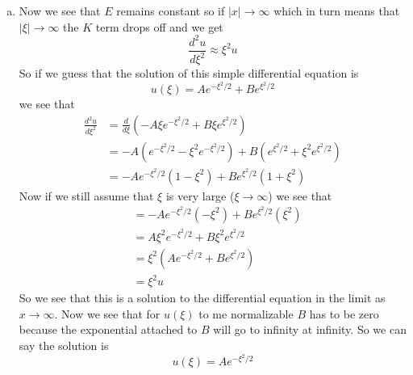 \documentclass[11pt]{article}
\numberwithin{equation}{section}
\begin{document}
\begin{enumerate}[(a)]
\item
Now we see that $E$ remains constant so if $|x|\rightarrow\infty$ which in turn means that $|\xi|\rightarrow\infty$ the $K$ term drops off and we get
$$\frac{d^2u}{d\xi^2} \approx \xi^2u$$
So if we guess that the solution of this simple differential equation is
$$u(\xi) = Ae^{-\xi^2/2} + Be^{\xi^2/2}$$
we see that
\begin{align*}
\frac{d^2u}{d\xi^2} &= \frac{d}{d\xi}\left(-A\xi e^{-\xi^2/2} + B\xi e^{\xi^2/2}\right)\\
&=-A\left(e^{-\xi^2/2}-\xi^2e^{-\xi^2/2}\right) + B\left(e^{\xi^2/2}+\xi^2e^{\xi^2/2}\right)\\
&=-Ae^{-\xi^2/2}\left(1-\xi^2\right) + Be^{\xi^2/2}\left(1+\xi^2\right)
\end{align*}
Now if we still assume that $\xi$ is very large ($\xi\rightarrow\infty$) we see that
\begin{align*}
&=-Ae^{-\xi^2/2}\left(-\xi^2\right) + Be^{\xi^2/2}\left(\xi^2\right)\\
&= A\xi^2e^{-\xi^2/2} + B\xi^2e^{\xi^2/2}\\
&= \xi^2\left(Ae^{-\xi^2/2} + Be^{\xi^2/2}\right)\\
&= \xi^2u
\end{align*}
So we see that this is a solution to the differential equation in the limit as $x\rightarrow\infty$. Now we see that for $u(\xi)$ to me normalizable $B$ has to be zero because the exponential attached to $B$ will go to infinity at infinity. So we can say the solution is
$$u(\xi) = Ae^{-\xi^2/2}$$


\end{enumerate}
\end{document}
